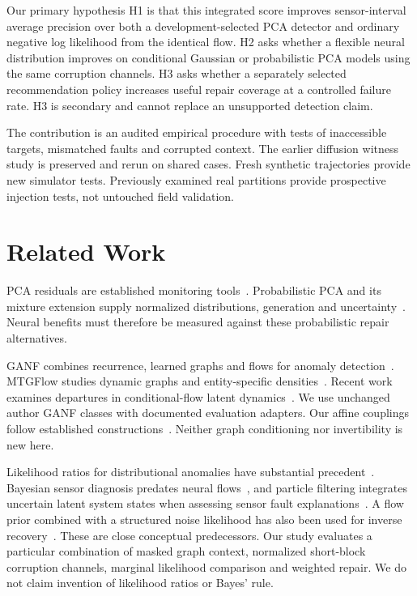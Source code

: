 \documentclass[conference]{IEEEtran}
\newcommand{\1}{\mathbf{1}}
\begin{document}
Our primary hypothesis H1 is that this integrated score improves sensor-interval average precision over both a development-selected PCA detector and ordinary negative log likelihood from the identical flow. H2 asks whether a flexible neural distribution improves on conditional Gaussian or probabilistic PCA models using the same corruption channels. H3 asks whether a separately selected recommendation policy increases useful repair coverage at a controlled failure rate. H3 is secondary and cannot replace an unsupported detection claim.

The contribution is an audited empirical procedure with tests of inaccessible targets, mismatched faults and corrupted context. The earlier diffusion witness study is preserved and rerun on shared cases. Fresh synthetic trajectories provide new simulator tests. Previously examined real partitions provide prospective injection tests, not untouched field validation.

\section{Related Work}
PCA residuals are established monitoring tools~\cite{pca}. Probabilistic PCA and its mixture extension supply normalized distributions, generation and uncertainty~\cite{ppca,mppca}. Neural benefits must therefore be measured against these probabilistic repair alternatives.

GANF combines recurrence, learned graphs and flows for anomaly detection~\cite{ganf}. MTGFlow studies dynamic graphs and entity-specific densities~\cite{mtgflow}. Recent work examines departures in conditional-flow latent dynamics~\cite{latentflow}. We use unchanged author GANF classes with documented evaluation adapters. Our affine couplings follow established constructions~\cite{realnvp}. Neither graph conditioning nor invertibility is new here.

Likelihood ratios for distributional anomalies have substantial precedent~\cite{ratio}. Bayesian sensor diagnosis predates neural flows~\cite{bayesfault}, and particle filtering integrates uncertain latent system states when assessing sensor fault explanations~\cite{wright}. A flow prior combined with a structured noise likelihood has also been used for inverse recovery~\cite{whang}. These are close conceptual predecessors. Our study evaluates a particular combination of masked graph context, normalized short-block corruption channels, marginal likelihood comparison and weighted repair. We do not claim invention of likelihood ratios or Bayes' rule.
\end{document}

